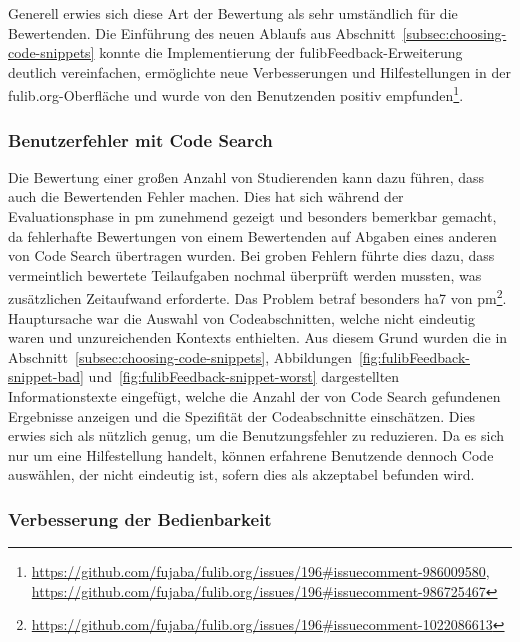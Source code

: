 Generell erwies sich diese Art der Bewertung als sehr umständlich für die Bewertenden.
Die Einführung des neuen Ablaufs aus Abschnitt~\ref{subsec:choosing-code-snippets} konnte die Implementierung der fulibFeedback-Erweiterung deutlich vereinfachen, ermöglichte neue Verbesserungen und Hilfestellungen in der fulib.org-Oberfläche und wurde von den Benutzenden positiv empfunden\footnote{
    \url{https://github.com/fujaba/fulib.org/issues/196\#issuecomment-986009580},
    \url{https://github.com/fujaba/fulib.org/issues/196\#issuecomment-986725467}
}.

\subsubsection{Benutzerfehler mit Code Search}

Die Bewertung einer großen Anzahl von Studierenden kann dazu führen, dass auch die Bewertenden Fehler machen.
Dies hat sich während der Evaluationsphase in \ac{pm} zunehmend gezeigt und besonders bemerkbar gemacht, da fehlerhafte Bewertungen von einem Bewertenden auf Abgaben eines anderen von Code Search übertragen wurden.
Bei groben Fehlern führte dies dazu, dass vermeintlich bewertete Teilaufgaben nochmal überprüft werden mussten, was zusätzlichen Zeitaufwand erforderte.
Das Problem betraf besonders \ac{ha}7 von \ac{pm}\footnote{
    \url{https://github.com/fujaba/fulib.org/issues/196\#issuecomment-1022086613}
}.
Hauptursache war die Auswahl von Codeabschnitten, welche nicht eindeutig waren und unzureichenden Kontexts enthielten.
Aus diesem Grund wurden die in Abschnitt~\ref{subsec:choosing-code-snippets}, Abbildungen~\ref{fig:fulibFeedback-snippet-bad} und~\ref{fig:fulibFeedback-snippet-worst} dargestellten Informationstexte eingefügt, welche die Anzahl der von Code Search gefundenen Ergebnisse anzeigen und die Spezifität der Codeabschnitte einschätzen.
Dies erwies sich als nützlich genug, um die Benutzungsfehler zu reduzieren.
Da es sich nur um eine Hilfestellung handelt, können erfahrene Benutzende dennoch Code auswählen, der nicht eindeutig ist, sofern dies als akzeptabel befunden wird.

\subsubsection{Verbesserung der Bedienbarkeit}

